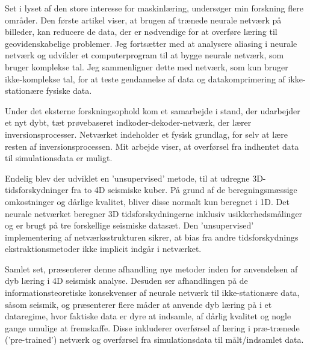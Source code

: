 Set i lyset af den store interesse for maskinl{\ae}ring, unders{\o}ger min forskning flere omr{\aa}der. Den f{\o}rste artikel viser, at brugen af tr{\ae}nede neurale netv{\ae}rk p{\aa} billeder, kan reducere de data, der er n{\o}dvendige for at overf{\o}re l{\ae}ring til geovidenskabelige problemer. Jeg forts{\ae}tter med at analysere aliasing i neurale netv{\ae}rk og udvikler et computerprogram til at bygge neurale netv{\ae}rk, som bruger komplekse tal. Jeg sammenligner dette med netv{\ae}rk, som kun bruger ikke-komplekse tal, for at teste gendannelse af data og datakomprimering af ikke-station{\ae}re fysiske data.

Under det eksterne forskningsophold kom et samarbejde i stand, der udarbejder et nyt dybt, t{\ae}t pr{\o}vebaseret indkoder-dekoder-netv{\ae}rk, der l{\ae}rer inversionsprocesser. Netv{\ae}rket indeholder et fysisk grundlag, for selv at l{\ae}re resten af inversionsprocessen. Mit arbejde viser, at overf{\o}rsel fra indhentet data til simulationsdata er muligt.

Endelig blev der udviklet en ’unsupervised’ metode, til at udregne 3D-tidsforskydninger fra to 4D seismiske kuber. P{\aa} grund af de beregningsm{\ae}ssige omkostninger og d{\aa}rlige kvalitet, bliver disse normalt kun beregnet i 1D. Det neurale netv{\ae}rket beregner 3D tidsforskydningerne inklusiv usikkerhedsm{\aa}linger og er brugt p{\aa} tre forskellige seismiske datas{\ae}t. Den ’unsupervised’ implementering af netv{\ae}rksstrukturen sikrer, at bias fra andre tidsforskydnings ekstraktionsmetoder ikke implicit indg{\aa}r i netv{\ae}rket.

Samlet set, pr{\ae}senterer denne afhandling nye metoder inden for anvendelsen af dyb l{\ae}ring i 4D seismisk analyse. Desuden ser afhandlingen p{\aa} de informationsteoretiske konsekvenser af neurale netv{\ae}rk til ikke-station{\ae}re data, s{\aa}som seismik, og pr{\ae}senterer flere m{\aa}der at anvende dyb l{\ae}ring p{\aa} i et dataregime, hvor faktiske data er dyre at indsamle, af d{\aa}rlig kvalitet og nogle gange umulige at fremskaffe. Disse inkluderer overf{\o}rsel af l{\ae}ring i pr{\ae}-tr{\ae}nede (’pre-trained’) netv{\ae}rk og overf{\o}rsel fra simulationsdata til m{\aa}lt/indsamlet data.